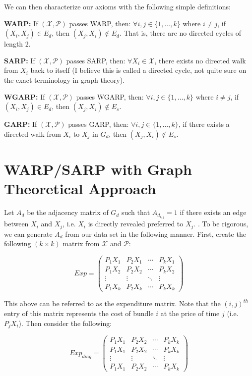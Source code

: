 \documentclass{article} %
\begin{document}
We can then characterize our axioms with the following simple definitions:


\textbf{WARP:} If $(\mathcal{X},\mathcal{P})$ passes WARP, then: $\forall i,j\in\{1,\dots,k\}$ where $i\not=j$, if $(X_i,X_j)\in E_d$, then $(X_j, X_i)\not\in E_d$.  That is, there are no directed cycles of length 2.


\textbf{SARP:} If $(\mathcal{X},\mathcal{P})$ passes SARP, then: $\forall X_i \in \mathcal{X}$, there exists no directed walk from $X_i$ back to itself (I believe this is called a directed cycle, not quite sure on the exact terminology in graph theory).


\textbf{WGARP:} If $(\mathcal{X},\mathcal{P})$ passes WGARP, then: $\forall i,j\in\{1,\dots,k\}$ where $i\not=j$, if $(X_i,X_j)\in E_d$, then $(X_j, X_i)\not\in E_s$.


\textbf{GARP:} If $(\mathcal{X},\mathcal{P})$ passes GARP, then: $\forall i,j\in\{1,\dots,k\}$, if there exists a directed walk from $X_i$ to $X_j$ in $G_d$, then $(X_j,X_i)\not\in E_s$.


\section{WARP/SARP with Graph Theoretical Approach}

Let $A_d$ be the adjacency matrix of $G_d$ such that $A_{d_{i,j}}=1$ if there exists an edge between $X_i$ and $X_j$, i.e. $X_i$ is directly revealed preferred to $X_j$. . To be rigorous, we can generate $A_d$ from our data set in the following manner. First, create the following $(k\times k)$ matrix from $\mathcal{X}$ and $\mathcal{P}$:

\[
Exp = 
 \begin{pmatrix}
  P_1X_1 & P_2X_1 & \cdots & P_kX_1 \\
  P_1X_2 & P_2X_2 & \cdots & P_kX_2 \\
  \vdots  & \vdots  & \ddots & \vdots  \\
  P_1X_k & P_2X_k & \cdots & P_kX_k
 \end{pmatrix}
\]

This above can be referred to as the expenditure matrix. Note that the $(i,j)^{th}$ entry of this matrix represents the cost of bundle $i$ at the price of time $j$ (i.e. $P_jX_i$). Then consider the following:

\[
Exp_{diag} = 
 \begin{pmatrix}
  P_1X_1 & P_2X_2 & \cdots & P_kX_k \\
  P_1X_1 & P_2X_2 & \cdots & P_kX_k \\
  \vdots  & \vdots  & \ddots & \vdots  \\
  P_1X_1 & P_2X_2 & \cdots & P_kX_k
 \end{pmatrix}
\]
\end{document}
